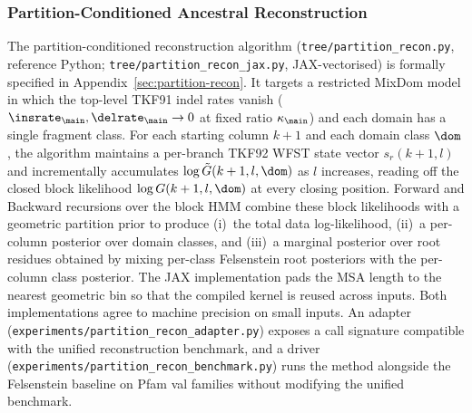 \subsubsection{Partition-Conditioned Ancestral Reconstruction}
The partition-conditioned reconstruction algorithm
(\texttt{tree/partition\_recon.py}, reference Python;
\texttt{tree/partition\_recon\_jax.py}, JAX-vectorised) is formally
specified in Appendix~\ref{sec:partition-recon}.
It targets a restricted MixDom model in which the top-level TKF91
indel rates vanish ($\insrate_\main, \delrate_\main \to 0$ at fixed
ratio $\kappa_\main$) and each domain has a single fragment class.
For each starting column $k+1$ and each domain class $\dom$, the
algorithm maintains a per-branch TKF92 WFST state vector
$s_r(k+1, l)$ and incrementally accumulates
$\log \tilde G(k+1, l, \dom)$ as $l$ increases, reading off the
closed block likelihood $\log G(k+1, l, \dom)$ at every closing
position. Forward and Backward recursions over the block HMM combine
these block likelihoods with a geometric partition prior to produce
(i)~the total data log-likelihood, (ii)~a per-column posterior over
domain classes, and (iii)~a marginal posterior over root residues
obtained by mixing per-class Felsenstein root posteriors with the
per-column class posterior. The JAX implementation pads the MSA
length to the nearest geometric bin so that the compiled kernel is
reused across inputs. Both implementations agree to machine
precision on small inputs. An adapter
(\texttt{experiments/partition\_recon\_adapter.py}) exposes a call
signature compatible with the unified reconstruction benchmark, and
a driver (\texttt{experiments/partition\_recon\_benchmark.py}) runs
the method alongside the Felsenstein baseline on Pfam val families
without modifying the unified benchmark.

